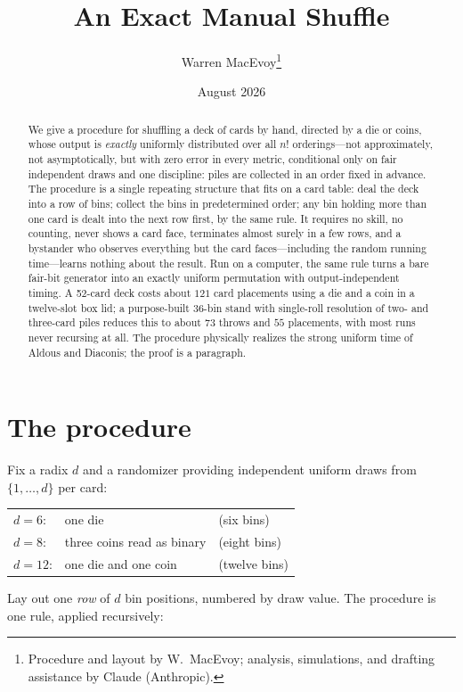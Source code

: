 \documentclass[11pt]{article}
\title{An Exact Manual Shuffle}
\author{Warren MacEvoy\thanks{Procedure and layout by W.~MacEvoy;
analysis, simulations, and drafting assistance by Claude (Anthropic).}}
\date{August 2026}
\begin{document}
\maketitle

\begin{abstract}
We give a procedure for shuffling a deck of cards by hand, directed by a
die or coins, whose output is \emph{exactly} uniformly distributed over
all $n!$ orderings---not approximately, not asymptotically, but with
zero error in every metric, conditional only on fair independent draws
and one discipline: piles are collected in an order fixed in advance.
The procedure is a single repeating structure that fits on a card table:
deal the deck into a row of bins; collect the bins in predetermined
order; any bin holding more than one card is dealt into the next row
first, by the same rule. It requires no skill, no counting, never shows
a card face, terminates almost surely in a few rows, and a bystander
who observes everything but the card faces---including the random
running time---learns nothing about the result. Run on a computer, the
same rule turns a bare fair-bit generator into an exactly uniform
permutation with output-independent timing. A 52-card deck costs about $121$ card placements using a die and a
coin in a twelve-slot box lid; a purpose-built 36-bin stand with
single-roll resolution of two- and three-card piles reduces this to
about $73$ throws and $55$ placements, with most runs never recursing
at all. The procedure physically realizes the strong uniform time of
Aldous and Diaconis; the proof is a paragraph.
\end{abstract}

\section{The procedure}

Fix a radix $d$ and a randomizer providing independent uniform draws
from $\{1,\dots,d\}$ per card:
\begin{center}
\begin{tabular}{lll}
$d=6$: & one die & (six bins) \\
$d=8$: & three coins read as binary & (eight bins) \\
$d=12$: & one die and one coin & (twelve bins) \\
\end{tabular}
\end{center}

Lay out one \emph{row} of $d$ bin positions, numbered by draw value. The procedure is one rule, applied recursively:
\end{document}
